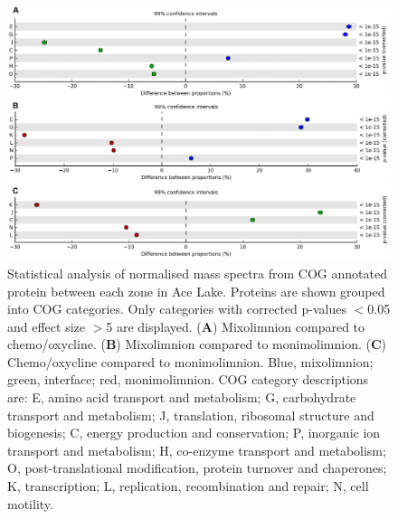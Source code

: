 \begin{figure}
\centering
\includegraphics[width=\textwidth]{ace_figures/stamp.pdf}
\caption[Statistical analysis of Ace Lake metaproteome]{ Statistical analysis of normalised mass spectra from \ac{COG} annotated protein between each zone in Ace Lake. 
Proteins are shown grouped into \ac{COG} categories.
Only categories with corrected p-values $<$0.05 and effect size $>$5 are displayed.
(\textbf{A}) Mixolimnion compared to chemo/oxycline. 
(\textbf{B}) Mixolimnion compared to monimolimnion.
(\textbf{C}) Chemo/oxycline compared to monimolimnion. 
Blue, mixolimnion; green, interface; red, monimolimnion.
\ac{COG} category descriptions are: E, amino acid transport and metabolism; G, carbohydrate transport and metabolism; J, translation, ribosomal structure and biogenesis; C, energy production and conservation; P, inorganic ion transport and metabolism; H, co-enzyme transport and metabolism; O, post-translational modification, protein turnover and chaperones; K, transcription; L, replication, recombination and repair; N, cell motility.
}
\label{fig:stamp}

\end{figure}
